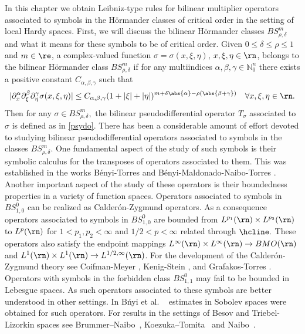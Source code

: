 In this chapter we obtain Leibniz-type rules for bilinear multiplier operators associated to symbols in the H\"ormander classes of critical order in the setting of local Hardy spaces. First, we will discuss the bilinear H\"ormander classes $BS^m_{\rho,\delta}$ and what it means for these symbols to be of critical order. Given $0\leq \delta \leq \rho \leq 1$ and $m\in\re$, a complex-valued function $\sigma = \sigma(x,\xi,\eta)$, $x,\xi,\eta \in \rn$, belongs to the bilinear H\"ormander class $BS^m_{\rho,\delta}$ if for any multiindices $\alpha,\beta,\gamma \in \mathbb{N}^n_0$ there exists a positive constant $C_{\alpha,\beta,\gamma}$ such that 
\begin{equation}\label{def:Bmrd}
|\partial_x^\alpha \partial_\xi^\beta \partial_\eta^\gamma \sigma(x, \xi, \eta)| \leq C_{\alpha, \beta, \gamma} (1+|\xi|+|\eta|)^{m +\delta \abs{\alpha}-\rho(\abs{\beta+\gamma})} \quad \forall x, \xi, \eta \in \rn.
\end{equation}
Then for any $\sigma \in BS^m_{\rho,\delta},$ the bilinear pseudodifferential operator $T_\sigma$ associated to $\sigma$ is defined as in \ref{psydo}. There has been a considerable amount of effort devoted to studying bilinear pseudodifferential operators associated to symbols in the classes $BS^m_{\rho,\delta}$. One fundamental aspect of the study of such symbols is their symbolic calculus for the transposes of operators associated to them. This was established in the works B\'enyi-Torres \citep{MR1986065} and B\'enyi-Maldonado-Naibo-Torres \citep{MR2660466}. Another important aspect of the study of these operators is their boundedness properties in a variety of function spaces. Operators associated to symbols in $BS^0_{1,0}$ can be realized as Calder\'on-Zygmund operators. As a consequence operators associated to symbols in $BS^0_{1,0}$ are bounded from $L^{p_1}(\rn) \times L^{p_2}(\rn)$ to  $L^p(\rn)$ for  $1 < p_1, p_2 < \infty$ and $1/2<p <\infty$ related through $\hcline.$ These operators also satisfy the endpoint mappings $L^\infty(\rn) \times L^\infty(\rn) \rightarrow BMO(\rn)$ and $L^1(\rn) \times L^1(\rn) \rightarrow L^{1/2, \infty}(\rn)$. For the development of the Calder\'on-Zygmund theory see Coifman-Meyer \citep{MR518170}, Kenig-Stein \citep{MR1713146}, and Grafakos-Torres \citep{MR1880324}. Operators with symbols in the forbidden class $BS^0_{1,1}$ may fail to be bounded in Lebesgue spaces. As such operators associated to these symbols are better understood in other settings. In B\'nyi et al. ~\cite{MR1996120, MR2250054, MR1986065} estimates in Sobolev spaces were obtained for such operators. For results in the settings of Besov and Triebel-Lizorkin spaces see Brummer--Naibo~\cite{MR3750234}, Koezuka--Tomita~\cite{MR3750316} and Naibo~\cite{MR3393696}.



